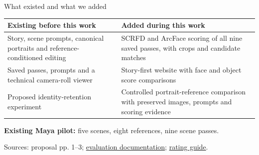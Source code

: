 \documentclass[aspectratio=169,11pt]{beamer}
\newcommand{\source}[1]{\par\vfill{\fontsize{7}{8}\selectfont\color{muted}#1\par}}
\newcommand{\repo}[2]{\href{https://github.com/aking526/ai-camera-roll/blob/84bd89bb9e947a0866aca6654ffc04a3a5d9119f/#1}{#2}}
\begin{document}
\begin{frame}{What existed and what we added}
\renewcommand{\arraystretch}{1.4}
\small
\begin{tabularx}{\textwidth}{@{}>{\raggedright\arraybackslash}X >{\raggedright\arraybackslash}X@{}}
\toprule
\textbf{Existing before this work} & \textbf{Added during this work}\\
\midrule
Story, scene prompts, canonical portraits and reference-conditioned editing & SCRFD and ArcFace scoring of all nine saved passes, with crops and candidate matches\\
Saved passes, prompts and a technical camera-roll viewer & Story-first website with face and object score comparisons\\
Proposed identity-retention experiment & Controlled portrait-reference comparison with preserved images, prompts and scoring evidence\\
\bottomrule
\end{tabularx}\par
\vspace{5mm}
\normalsize\textbf{Existing Maya pilot:} five scenes, eight references, nine scene passes.
\source{Sources: proposal pp. 1--3; \repo{evaluation/README.md}{evaluation documentation}; \repo{demo_site/RATING_GUIDE.txt}{rating guide}.}
\end{frame}
\end{document}
